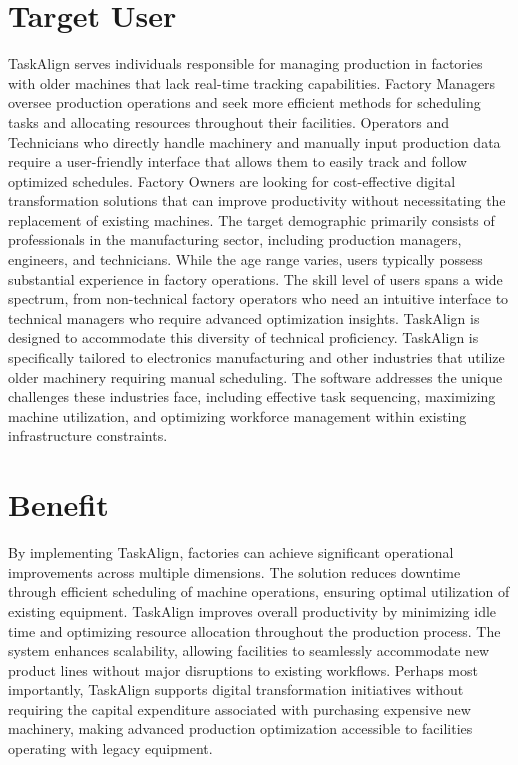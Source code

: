 \section{Target User}
\label{section:target-user}

TaskAlign serves individuals responsible for managing production in factories with older machines that lack real-time tracking capabilities. Factory Managers oversee production operations and seek more efficient methods for scheduling tasks and allocating resources throughout their facilities. Operators and Technicians who directly handle machinery and manually input production data require a user-friendly interface that allows them to easily track and follow optimized schedules. Factory Owners are looking for cost-effective digital transformation solutions that can improve productivity without necessitating the replacement of existing machines.
The target demographic primarily consists of professionals in the manufacturing sector, including production managers, engineers, and technicians. While the age range varies, users typically possess substantial experience in factory operations. The skill level of users spans a wide spectrum, from non-technical factory operators who need an intuitive interface to technical managers who require advanced optimization insights. TaskAlign is designed to accommodate this diversity of technical proficiency.
TaskAlign is specifically tailored to electronics manufacturing and other industries that utilize older machinery requiring manual scheduling. The software addresses the unique challenges these industries face, including effective task sequencing, maximizing machine utilization, and optimizing workforce management within existing infrastructure constraints.

\section{Benefit}
\label{section:benefit}

By implementing TaskAlign, factories can achieve significant operational improvements across multiple dimensions. The solution reduces downtime through efficient scheduling of machine operations, ensuring optimal utilization of existing equipment. TaskAlign improves overall productivity by minimizing idle time and optimizing resource allocation throughout the production process. The system enhances scalability, allowing facilities to seamlessly accommodate new product lines without major disruptions to existing workflows. Perhaps most importantly, TaskAlign supports digital transformation initiatives without requiring the capital expenditure associated with purchasing expensive new machinery, making advanced production optimization accessible to facilities operating with legacy equipment.

